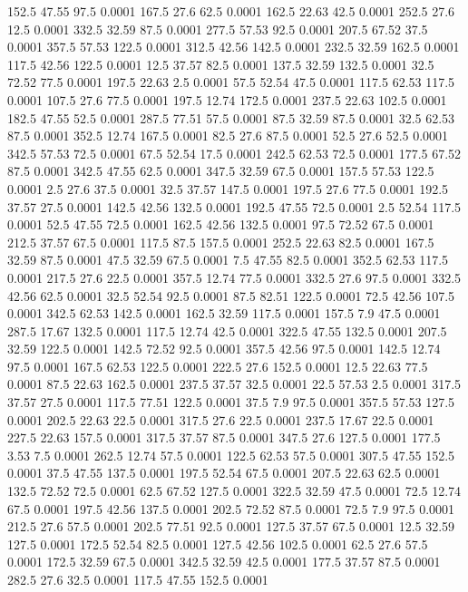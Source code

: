 152.5	47.55	97.5	0.0001
167.5	27.6	62.5	0.0001
162.5	22.63	42.5	0.0001
252.5	27.6	12.5	0.0001
332.5	32.59	87.5	0.0001
277.5	57.53	92.5	0.0001
207.5	67.52	37.5	0.0001
357.5	57.53	122.5	0.0001
312.5	42.56	142.5	0.0001
232.5	32.59	162.5	0.0001
117.5	42.56	122.5	0.0001
12.5	37.57	82.5	0.0001
137.5	32.59	132.5	0.0001
32.5	72.52	77.5	0.0001
197.5	22.63	2.5	0.0001
57.5	52.54	47.5	0.0001
117.5	62.53	117.5	0.0001
107.5	27.6	77.5	0.0001
197.5	12.74	172.5	0.0001
237.5	22.63	102.5	0.0001
182.5	47.55	52.5	0.0001
287.5	77.51	57.5	0.0001
87.5	32.59	87.5	0.0001
32.5	62.53	87.5	0.0001
352.5	12.74	167.5	0.0001
82.5	27.6	87.5	0.0001
52.5	27.6	52.5	0.0001
342.5	57.53	72.5	0.0001
67.5	52.54	17.5	0.0001
242.5	62.53	72.5	0.0001
177.5	67.52	87.5	0.0001
342.5	47.55	62.5	0.0001
347.5	32.59	67.5	0.0001
157.5	57.53	122.5	0.0001
2.5	27.6	37.5	0.0001
32.5	37.57	147.5	0.0001
197.5	27.6	77.5	0.0001
192.5	37.57	27.5	0.0001
142.5	42.56	132.5	0.0001
192.5	47.55	72.5	0.0001
2.5	52.54	117.5	0.0001
52.5	47.55	72.5	0.0001
162.5	42.56	132.5	0.0001
97.5	72.52	67.5	0.0001
212.5	37.57	67.5	0.0001
117.5	87.5	157.5	0.0001
252.5	22.63	82.5	0.0001
167.5	32.59	87.5	0.0001
47.5	32.59	67.5	0.0001
7.5	47.55	82.5	0.0001
352.5	62.53	117.5	0.0001
217.5	27.6	22.5	0.0001
357.5	12.74	77.5	0.0001
332.5	27.6	97.5	0.0001
332.5	42.56	62.5	0.0001
32.5	52.54	92.5	0.0001
87.5	82.51	122.5	0.0001
72.5	42.56	107.5	0.0001
342.5	62.53	142.5	0.0001
162.5	32.59	117.5	0.0001
157.5	7.9	47.5	0.0001
287.5	17.67	132.5	0.0001
117.5	12.74	42.5	0.0001
322.5	47.55	132.5	0.0001
207.5	32.59	122.5	0.0001
142.5	72.52	92.5	0.0001
357.5	42.56	97.5	0.0001
142.5	12.74	97.5	0.0001
167.5	62.53	122.5	0.0001
222.5	27.6	152.5	0.0001
12.5	22.63	77.5	0.0001
87.5	22.63	162.5	0.0001
237.5	37.57	32.5	0.0001
22.5	57.53	2.5	0.0001
317.5	37.57	27.5	0.0001
117.5	77.51	122.5	0.0001
37.5	7.9	97.5	0.0001
357.5	57.53	127.5	0.0001
202.5	22.63	22.5	0.0001
317.5	27.6	22.5	0.0001
237.5	17.67	22.5	0.0001
227.5	22.63	157.5	0.0001
317.5	37.57	87.5	0.0001
347.5	27.6	127.5	0.0001
177.5	3.53	7.5	0.0001
262.5	12.74	57.5	0.0001
122.5	62.53	57.5	0.0001
307.5	47.55	152.5	0.0001
37.5	47.55	137.5	0.0001
197.5	52.54	67.5	0.0001
207.5	22.63	62.5	0.0001
132.5	72.52	72.5	0.0001
62.5	67.52	127.5	0.0001
322.5	32.59	47.5	0.0001
72.5	12.74	67.5	0.0001
197.5	42.56	137.5	0.0001
202.5	72.52	87.5	0.0001
72.5	7.9	97.5	0.0001
212.5	27.6	57.5	0.0001
202.5	77.51	92.5	0.0001
127.5	37.57	67.5	0.0001
12.5	32.59	127.5	0.0001
172.5	52.54	82.5	0.0001
127.5	42.56	102.5	0.0001
62.5	27.6	57.5	0.0001
172.5	32.59	67.5	0.0001
342.5	32.59	42.5	0.0001
177.5	37.57	87.5	0.0001
282.5	27.6	32.5	0.0001
117.5	47.55	152.5	0.0001
